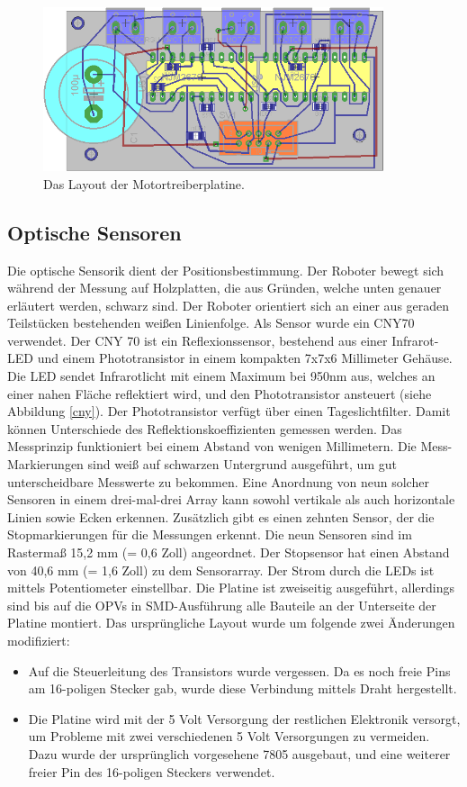 \documentclass[a4paper,bibtotoc,oneside]{scrbook}
\begin{document}
\begin{figure}[htbp]
\centering
\includegraphics[width=100mm]{img/hdrive.png}
\caption{Das Layout der Motortreiberplatine.}\label{hbridge2}
\end{figure}

\FloatBarrier

\subsection{Optische Sensoren}\thispagestyle{empty}
Die optische Sensorik dient der Positionsbestimmung. Der Roboter bewegt sich während der Messung auf Holzplatten, die aus Gründen, welche unten genauer erläutert werden, schwarz sind. Der Roboter orientiert sich an einer aus geraden Teilstücken bestehenden weißen Linienfolge. 
Als Sensor wurde ein CNY70 \cite{cny} verwendet. Der CNY 70 ist ein Reflexionssensor, bestehend aus einer Infrarot-LED und einem Phototransistor in einem kompakten 7x7x6 Millimeter Gehäuse. Die LED sendet Infrarotlicht mit einem Maximum bei 950nm aus, welches an einer nahen Fläche reflektiert wird, und den Phototransistor ansteuert (siehe Abbildung \ref{cny}). Der Phototransistor verfügt über einen Tageslichtfilter. Damit können Unterschiede des Reflektionskoeffizienten gemessen werden. Das Messprinzip funktioniert bei einem Abstand von wenigen Millimetern.  Die Mess-Markierungen sind weiß auf schwarzen Untergrund ausgeführt, um gut unterscheidbare Messwerte zu bekommen. Eine Anordnung von neun solcher Sensoren in einem drei-mal-drei Array kann sowohl vertikale als auch horizontale Linien sowie Ecken erkennen. Zusätzlich gibt es einen zehnten Sensor, der die Stopmarkierungen für die Messungen erkennt.
Die neun Sensoren sind im Rastermaß 15,2 mm (= 0,6 Zoll) angeordnet. Der Stopsensor hat einen Abstand von 40,6 mm (= 1,6 Zoll) zu dem Sensorarray. 
Der Strom durch die LEDs ist mittels Potentiometer einstellbar. 
Die Platine ist zweiseitig ausgeführt, allerdings sind bis auf die OPVs in SMD-Ausführung alle Bauteile an der Unterseite der Platine montiert. Das ursprüngliche Layout wurde um folgende zwei Änderungen modifiziert:
\begin{itemize}
\item Auf die Steuerleitung des Transistors wurde vergessen. Da es noch freie Pins am 16-poligen Stecker gab, wurde diese Verbindung mittels Draht hergestellt.
\item Die Platine wird mit der 5 Volt Versorgung der restlichen Elektronik versorgt, um Probleme mit zwei verschiedenen 5 Volt Versorgungen zu vermeiden. Dazu wurde der ursprünglich vorgesehene 7805 ausgebaut, und eine weiterer freier Pin des 16-poligen Steckers verwendet.
\end{itemize}
\end{document}
